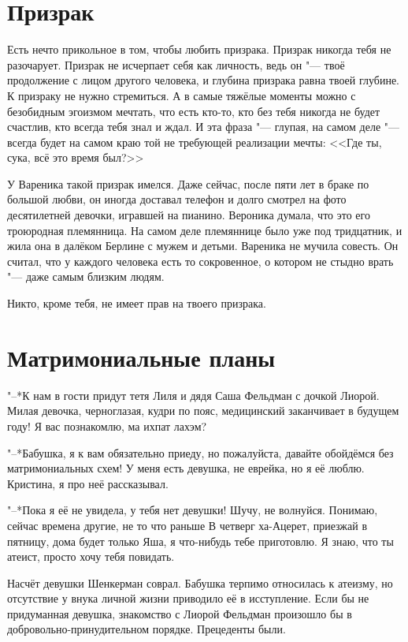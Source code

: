 \section{Призрак}

Есть нечто прикольное в том, чтобы любить призрака.
Призрак никогда тебя не разочарует.
Призрак не исчерпает себя как личность, ведь он "--- твоё продолжение с лицом другого человека, и глубина призрака равна твоей глубине.
К призраку не нужно стремиться.
А в самые тяжёлые моменты можно с безобидным эгоизмом мечтать, что есть кто-то, кто без тебя никогда не будет счастлив, кто всегда тебя знал и ждал.
И эта фраза "--- глупая, на самом деле "--- всегда будет на самом краю той не требующей реализации мечты: <<Где ты, сука, всё это время был?>>

У Вареника такой призрак имелся.
Даже сейчас, после пяти лет в браке по большой любви, он иногда доставал телефон и долго смотрел на фото десятилетней девочки, игравшей на пианино.
Вероника думала, что это его троюродная племянница.
На самом деле племяннице было уже под тридцатник, и жила она в далёком Берлине с мужем и детьми.
Вареника не мучила совесть.
Он считал, что у каждого человека есть то сокровенное, о котором не стыдно врать "--- даже самым близким людям.

Никто, кроме тебя, не имеет прав на твоего призрака.

\section{Матримониальные планы}

"--*К нам в гости придут тетя Лиля и дядя Саша Фельдман с дочкой Лиорой.
Милая девочка, черноглазая, кудри по пояс, медицинский заканчивает в будущем году!
Я вас познакомлю, ма ихпат лахэм?

"--*Бабушка, я к вам обязательно приеду, но пожалуйста, давайте обойдёмся без матримониальных схем!
У меня есть девушка, не еврейка, но я её люблю.
Кристина, я про неё рассказывал.

"--*Пока я её не увидела, у тебя нет девушки!
Шучу, не волнуйся.
Понимаю, сейчас времена другие, не то что раньше\ldotst
В четверг ха-Ацерет, приезжай в пятницу, дома будет только Яша, я что-нибудь тебе приготовлю.
Я знаю, что ты атеист, просто хочу тебя повидать.

Насчёт девушки Шенкерман соврал.
Бабушка терпимо относилась к атеизму, но отсутствие у внука личной жизни приводило её в исступление.
Если бы не придуманная девушка, знакомство с Лиорой Фельдман произошло бы в добровольно-принудительном порядке.
Прецеденты были.

